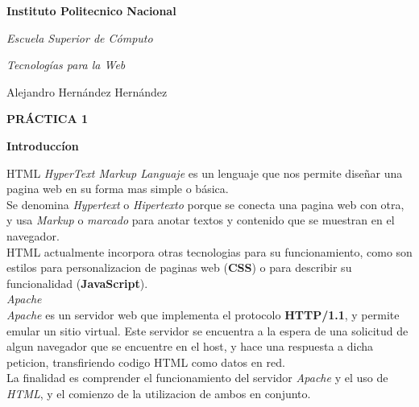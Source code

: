 \documentclass[12pt,letterpaper]{article}
\begin{document}
{\Huge {\rm { \bf Instituto Politecnico Nacional}}}\\
\begin{center}
{\huge {\rm {\em Escuela Superior de C\'omputo}}} \\
\end{center}
\begin{center}
{\Large {\em Tecnolog\'ias para la Web}}\\
\end{center}
\begin{center}
{\Large Alejandro Hern\'andez Hern\'andez}\\
\end{center}
\begin{center}
{\huge {\bf PR\'ACTICA 1}}
\end{center}

\newpage %
{\Huge {\rm {\bf Introducc\'ion}}}
\\
\begin{flushleft}
HTML {\em HyperText Markup Languaje} es un lenguaje que nos permite dise\~nar una pagina web en su forma mas simple o b\'asica.
\\Se denomina {\em Hypertext} o {\em Hipertexto} porque se conecta una pagina web con otra, y usa {\em Markup} o {\em marcado} para anotar textos y contenido que se muestran en el navegador.
\\
HTML actualmente incorpora otras tecnologias para su funcionamiento, como son estilos para personalizacion de paginas web ({\bf CSS}) o para describir su funcionalidad ({\bf JavaScript}).\\
\vspace{1.5cm}
{\large {\em Apache}}
\\
{\em Apache} es un servidor web que implementa el protocolo {\bf HTTP/1.1}, y permite emular un sitio virtual. Este servidor se encuentra a la espera de una solicitud de algun navegador que se encuentre en el host, y hace una respuesta a dicha peticion, transfiriendo codigo HTML como datos en red.
\\
\vspace{1.5cm}
La finalidad es comprender el funcionamiento del servidor {\em Apache} y el uso de {\em HTML}, y el comienzo de la utilizacion de ambos en conjunto.


\end{flushleft}
\end{document}

